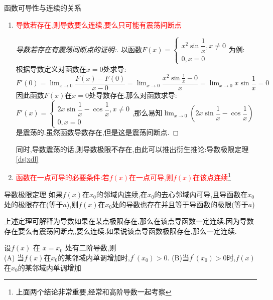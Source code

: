 \documentclass[8pt a4paper, oneside, UTF8]{ctexbook}  %
\begin{document}
\begin{sloppypar}
    \begin{criterion}{函数可导性与连续的关系}{}
        \begin{enumerate}
            \item \textcolor{red}{导数若存在,则导数要么连续,要么只可能有震荡间断点}
            \begin{proof}[导数若存在有震荡间断点的证明:]
                以函数$F(x)=\begin{cases}
                    x^2 \sin \dfrac{1}{x} ,x \neq 0\\
                    0,x=0
                \end{cases}$为例:
                \\根据导数定义对函数在$x=0$处求导:$F'(0)=\lim_{x\to 0}\dfrac{F(x)-F(0)}{x-0}=\lim_{x\to 0}\dfrac{x^2 \sin \frac1x - 0}{x}=\lim_{x\to 0}x \sin \dfrac{1}{x}=0$因此函数$F(x)$在$x=0$处导数存在.那么对函数求导:\\
                $F'(x)=\begin{cases}
                    2x \sin \dfrac{1}{x} -\cos \dfrac{1}{x} ,x\neq 0\\
                    0 ,x=0
                \end{cases}$,那么易知$\lim_{x\to 0}\left(2 x \sin \dfrac{1}{x} -\cos \dfrac{1}{x} \right)$是震荡的.虽然函数导数存在,但是这是震荡间断点.
            \end{proof}
            同时,导数震荡的话,则导数极限不存在,由此可以推出衍生推论:导数极限定理\ref{dsjxdl}
            \item \textcolor{red}{函数在一点可导的必要条件:若$f(x)$在一点可导,则$f(x)$在该点连续}\footnote{上面两个结论非常重要,经常和高阶导数一起考察}
        \end{enumerate}
    \end{criterion}
    \begin{them}{导数极限定理}{}\label{dsjxdl}
        如果$f(x)$在$x_0$的邻域内连续,在$x_{0}$的去心邻域内可导,且导函数在$x_{0}$处的极限存在(等于$a$),则$f(x)$在$x_0$处的导数也存在并且等于导函数的极限(等于$a$)
    \end{them}
        上述定理可解释为导数如果在某点极限存在,那么在该点导函数一定连续.因为导数存在要么有震荡间断点,要么连续.如果说该点导函数极限存在,那么一定连续.
    \begin{problem}
        设$f(x)$ 在 $x=x_0$ 处有二阶导数,则\\
        (A) 当$f(x)$在$x_0$的某邻域内单调增加时,$f^\prime(x_0)>0.$
        (B)当$f^\prime(x_0)>0$时,$f(x)$在$x_0$的某邻域内单调增加\\

\end{problem}
\end{sloppypar}
\end{document}

